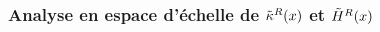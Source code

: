 %
%
%
%
%
%
%
\subsubsection{Analyse en espace d'échelle de $\tilde{\kappa}^{R}(x)$ et $\tilde{H}^{R}(x)$}%
\label{sec:applications:feature:II:analyse}

